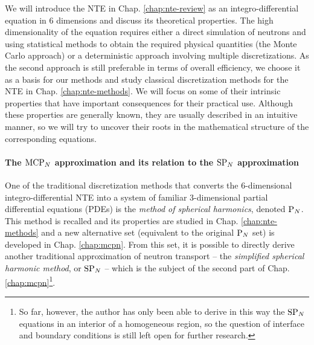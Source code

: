 We will introduce the NTE in Chap. \ref{chap:nte-review} as an integro-differential equation in 6 dimensions and
discuss its theoretical properties. The high dimensionality of the equation requires either a direct simulation of
neutrons and using statistical methods to obtain the required physical quantities (the Monte Carlo approach) or a deterministic approach involving multiple discretizations.
As the second approach is still preferable in terms of overall efficiency, we choose it as a basis for our methods and
study classical discretization methods for the NTE in Chap. \ref{chap:nte-methods}. We will focus on some of
their intrinsic properties that have important consequences for their practical use. Although these properties are
generally known, they are usually described in an intuitive manner, so we will try to uncover their roots in the
mathematical structure of the corresponding equations.

\paragraph{The $\text{MCP}_{N}$ approximation and its relation to the $\text{SP}_{N}$ approximation} 
One of the traditional discretization methods that converts the 6-dimensional integro-differential NTE into a system of
familiar 3-dimensional partial differential equations (PDEs) is the
\textit{method of spherical harmonics}, denoted $\text{P}_{N}$. This method is recalled and its properties are
studied in Chap. \ref{chap:nte-methods} and a new alternative set (equivalent to the original $\text{P}_{N}$ set) is developed in
Chap. \ref{chap:mcpn}. From this set, it is possible to directly derive another traditional approximation of neutron
transport -- the \textit{simplified spherical harmonic method}, or $\text{SP}_{N}$  -- which is the subject of the second part of Chap. \ref{chap:mcpn}\footnote{So far, however,
the author has only been able to derive in this way the $\text{SP}_{N}$ equations in an interior of a homogeneous region, so the
question of interface and boundary conditions is still left open for further research.}. 

